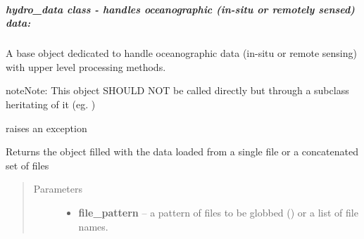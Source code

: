\documentclass[letterpaper,10pt,english]{sphinxmanual}
\begin{document}
\subparagraph{hydro\_data class - handles oceanographic (in-situ or remotely sensed) data:}
\label{altimetry.data:hydro-data-class-handles-oceanographic-in-situ-or-remotely-sensed-data}\label{altimetry.data:hydro-data}

\begin{fulllineitems}
\label{altimetry.data:altimetry.data.hydro_data}
A base object dedicated to handle oceanographic data (in-situ or remote sensing) with upper level processing methods.

\begin{notice}{note}{Note:}
This object SHOULD NOT be called directly but through a subclass heritating of it (eg. {\hyperref[altimetry.data:altimetry.data.alti_data]{}})
\end{notice}

\begin{fulllineitems}
\label{altimetry.data:altimetry.data.hydro_data.Error}
raises an exception

\end{fulllineitems}


\begin{fulllineitems}
\label{altimetry.data:altimetry.data.hydro_data.__init__}
Returns the object filled with the data loaded from a single file or a concatenated set of files
\begin{quote}\begin{description}
\item[{Parameters}] \leavevmode\begin{itemize}
\item {} 
\textbf{file\_pattern} -- a pattern of files to be globbed (\href{http://docs.python.org/library/glob.html\#glob.glob}{}) or a list of file names.


\end{itemize}
\end{description}
\end{quote}
\end{fulllineitems}
\end{fulllineitems}
\end{document}
